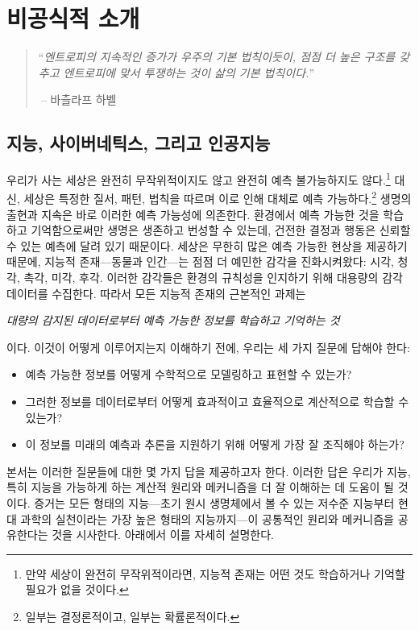 \documentclass[../../book-main_ko.tex]{subfiles}
\begin{document}
\chapter{비공식적 소개}
\label{ch:intro}

\begin{quote}
``{\em 엔트로피의 지속적인 증가가 우주의 기본 법칙이듯이, 점점 더 높은 구조를 갖추고 엔트로피에 맞서 투쟁하는 것이 삶의 기본 법칙이다.}''

$~$\hfill -- 바츨라프 하벨
 \end{quote}
\vspace{5mm}



\section{지능, 사이버네틱스, 그리고 인공지능}
우리가 사는 세상은 완전히 무작위적이지도 않고 완전히 예측 불가능하지도 않다.\footnote{만약 세상이 완전히 무작위적이라면, 지능적 존재는 어떤 것도 학습하거나 기억할 필요가 없을 것이다.} 대신, 세상은 특정한 질서, 패턴, 법칙을 따르며 이로 인해 대체로 예측 가능하다.\footnote{일부는 결정론적이고, 일부는 확률론적이다.} 생명의 출현과 지속은 바로 이러한 예측 가능성에 의존한다. 환경에서 예측 가능한 것을 학습하고 기억함으로써만 생명은 생존하고 번성할 수 있는데, 건전한 결정과 행동은 신뢰할 수 있는 예측에 달려 있기 때문이다. 세상은 무한히 많은 예측 가능한 현상을 제공하기 때문에, 지능적 존재---동물과 인간---는 점점 더 예민한 감각을 진화시켜왔다: 시각, 청각, 촉각, 미각, 후각. 이러한 감각들은 환경의 규칙성을 인지하기 위해 대용량의 감각 데이터를 수집한다. 따라서 모든 지능적 존재의 근본적인 과제는
\begin{center}
    \textit{대량의 감지된 데이터로부터 예측 가능한 정보를 학습하고 기억하는 것}
\end{center}
이다. 이것이 어떻게 이루어지는지 이해하기 전에, 우리는 세 가지 질문에 답해야 한다:
\begin{itemize}
    \item 예측 가능한 정보를 어떻게 수학적으로 모델링하고 표현할 수 있는가?
    \item 그러한 정보를 데이터로부터 어떻게 효과적이고 효율적으로 계산적으로 학습할 수 있는가?
    \item 이 정보를 미래의 예측과 추론을 지원하기 위해 어떻게 가장 잘 조직해야 하는가?
\end{itemize}
본서는 이러한 질문들에 대한 몇 가지 답을 제공하고자 한다. 이러한 답은 우리가 지능, 특히 지능을 가능하게 하는 계산적 원리와 메커니즘을 더 잘 이해하는 데 도움이 될 것이다. 증거는 모든 형태의 지능---초기 원시 생명체에서 볼 수 있는 저수준 지능부터 현대 과학의 실천이라는 가장 높은 형태의 지능까지---이 공통적인 원리와 메커니즘을 공유한다는 것을 시사한다. 아래에서 이를 자세히 설명한다.
\end{document}
